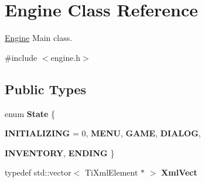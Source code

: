 \hypertarget{classEngine}{
\section{Engine Class Reference}
\label{classEngine}
}


\hyperlink{classEngine}{Engine} Main class.  




{\ttfamily \#include $<$engine.h$>$}

\subsection*{Public Types}
\begin{DoxyCompactItemize}
\item 
enum {\bfseries State} \{ \par
{\bfseries INITIALIZING} =  0, 
{\bfseries MENU}, 
{\bfseries GAME}, 
{\bfseries DIALOG}, 
\par
{\bfseries INVENTORY}, 
{\bfseries ENDING}
 \}
\item 
\hypertarget{classEngine_a57d25a7a5c786a404ffd8e50389c6397}{
typedef std::vector$<$ TiXmlElement $\ast$ $>$ {\bfseries XmlVect}}
\label{classEngine_a57d25a7a5c786a404ffd8e50389c6397}

\end{DoxyCompactItemize}
